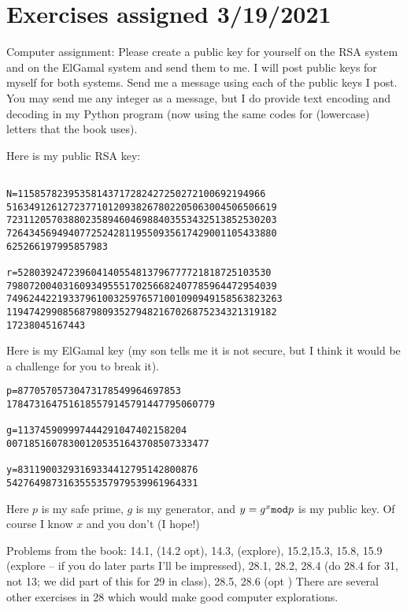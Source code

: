 \documentclass[12pt]{article}
\begin{document}
\section{Exercises assigned 3/19/2021}

Computer assignment:  Please create a public key for yourself on the RSA system and on the ElGamal system and send them to me.  I will post public keys for myself for both systems.  Send me a message using each of the public keys I post.  You may send me any integer as a message, but I do provide text encoding and decoding in my Python program
(now using the same codes for (lowercase) letters that the book uses).

Here is my public RSA key:

\begin{verbatim}

N=11585782395358143717282427250272100692194966
516349126127237710120938267802205063004506506619
723112057038802358946046988403553432513852530203
726434569494077252428119550935617429001105433880
625266197995857983

r=528039247239604140554813796777721818725103530
798072004031609349555170256682407785964472954039
7496244221933796100325976571001090949158563823263
119474299085687980935279482167026875234321319182
17238045167443

\end{verbatim}

Here is my ElGamal key (my son tells me it is not secure, but I think it would be a challenge for you to break it).

\begin{verbatim}
p=87705705730473178549964697853
1784731647516185579145791447795060779

g=113745909997444291047402158204
007185160783001205351643708507333477

y=83119003293169334412795142800876
5427649873163555357979539961964331
\end{verbatim}

Here $p$ is my safe prime, $g$ is my generator, and $y = g^x {\tt mod} p$ is my public key.  Of course I know $x$ and you don't (I hope!)



Problems from the book:  14.1, (14.2 opt), 14.3, (explore), 15.2,15.3, 15.8, 15.9 (explore -- if you do later parts I'll be impressed), 28.1, 28.2, 28.4 (do 28.4 for 31, not 13;  we did part of this for 29 in class),  28.5,  28.6 (opt )  There are several other exercises in 28 which would make good computer explorations.
\end{document}
